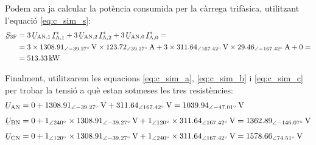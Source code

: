 \begin{exemple}
    Podem ara ja calcular la pot\`{e}ncia consumida per la c\`{a}rrega
    trif\`{a}sica, utilitzant l'equaci\'{o} \eqref{eq:c_sim_s}:
    \[
    \begin{split}
    \cmplx{S}\ped{3F} &=  3\, \cmplx{U}\ped{AN,1}\,
    \cmplx{I}\ped{A,1}^* + 3\, \cmplx{U}\ped{AN,2}\,
    \cmplx{I}\ped{A,2}^* +  3\,
    \cmplx{U}\ped{AN,0}\,  \cmplx{I}\ped{A,0}^* = \\
    &= 3 \times \SIpd{1308,91}{-39,27}{V} \times
    \SIpd{123,72}{39,27}{A} + 3 \times
    \SIpd{311,64}{167,42}{V} \times \SIpd{29,46}{-167,42}{A} + 0 = \\
    &= \SI{513,33}{kW}
    \end{split}
    \]

    Finalment, utilitzarem les equacions \eqref{eq:c_sim_a},
    \eqref{eq:c_sim_b} i \eqref{eq:c_sim_c} per trobar la tensi\'{o} a qu\`{e}
    estan sotmeses les tres resist\`{e}ncies:
    \begin{align*}
        \cmplx{U}\ped{AN} &= 0 + \SIpd{1308,91}{-39,27}{V} +
        \SIpd{311,64}{167,42}{V}  =
        \SIpd{1039,94}{-47,01}{V} \\[1ex]
        \cmplx{U}\ped{BN} &= 0 + \numpd{1}{240} \times
        \SIpd{1308,91}{-39,27}{V} +
        \numpd{1}{120} \times
        \SIpd{311,64}{167,42}{V}  =
        \SIpd{1362,89}{-146,07}{V}    \\[1ex]
        \cmplx{U}\ped{CN} &= 0 + \numpd{1}{120} \times
        \SIpd{1308,91}{-39,27}{V} +
        \numpd{1}{240} \times \SIpd{311,64}{167,42}{V}  =
        \SIpd{1578,66}{74,51}{V}
    \end{align*}
\end{exemple}
